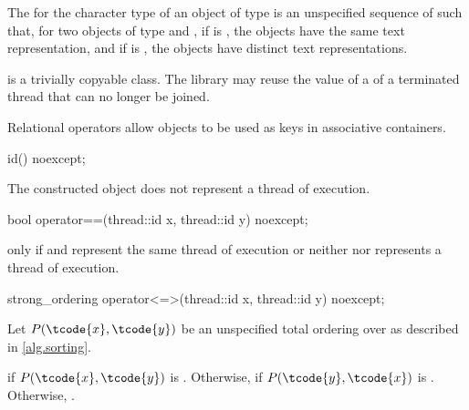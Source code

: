 \pnum
The  for
the character type  of an object of type 
is an unspecified sequence of  such that,
for two objects of type   and ,
if  is ,
the  objects have the same text representation, and
if  is ,
the  objects have distinct text representations.

\pnum
{} is a trivially copyable class.
The library may reuse the value of a  of a terminated thread that can no longer be joined.

\pnum
\begin{note}
Relational operators allow  objects to be used as
keys in associative containers.
\end{note}

%
\begin{itemdecl}
id() noexcept;
\end{itemdecl}

\begin{itemdescr}
\pnum
\ensures
The constructed object does not represent a thread of execution.
\end{itemdescr}

%
\begin{itemdecl}
bool operator==(thread::id x, thread::id y) noexcept;
\end{itemdecl}

\begin{itemdescr}
\pnum
\returns
{} only if  and  represent the same
thread of execution or neither  nor  represents a thread of
execution.
\end{itemdescr}

%
\begin{itemdecl}
strong_ordering operator<=>(thread::id x, thread::id y) noexcept;
\end{itemdecl}

\begin{itemdescr}
\pnum
Let $P(\tcode{x}, \tcode{y})$ be
an unspecified total ordering over 
as described in \ref{alg.sorting}.

\pnum
\returns
{} if $P(\tcode{x}, \tcode{y})$ is .
Otherwise, 
if $P(\tcode{y}, \tcode{x})$ is .
Otherwise, .
\end{itemdescr}

